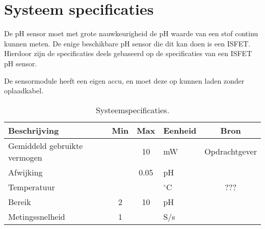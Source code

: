 \section{Systeem specificaties}
De pH sensor moet met grote nauwkeurigheid de pH waarde van een stof continu kunnen meten. 
De enige beschikbare pH sensor die dit kan doen is een ISFET.
Hierdoor zijn de specificaties deels gebaseerd op de specificaties van een ISFET pH sensor.

De sensormodule heeft een eigen accu, en moet deze op kunnen laden zonder oplaadkabel.

\begin{table}[ht]
    \centering
    \begin{tabular}{|l|c c|l|c|}
        \hline
        Beschrijving                 & Min & Max  & Eenheid   & Bron \\
        \hline 
        Gemiddeld gebruikte vermogen &     & 10   & mW        & Opdrachtgever \\
        Afwijking                    &     & 0.05 & pH        & \cite{isfet} \\ 
        Temperatuur                  &     &      & $^\circ$C & ???           \\
        Bereik                       & 2   & 10   & pH        & \cite{isfet} \\
        Metingssnelheid              & 1   &      & S/s       & \cite{isfet} \\
        \hline
    \end{tabular}
    \caption{Systeemspecificaties.}
    \label{tab:systemSpecs}
\end{table}




